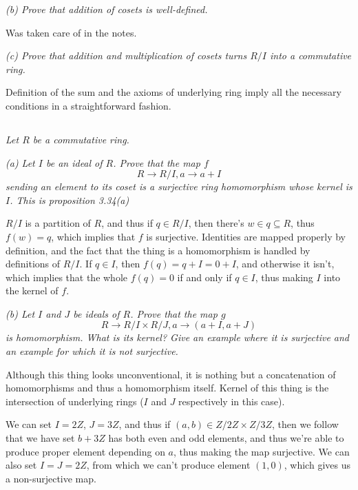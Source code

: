 \documentclass[11pt,oneside,titlepage]{book}
\begin{document}
\textit{(b) Prove that addition of cosets is well-defined.}

Was taken care of in the notes.

\textit{(c) Prove that addition and multiplication of cosets turns
  $R/I$ into a commutative ring.}

Definition of the sum and the axioms of underlying ring imply all the
necessary conditions in a straightforward fashion.

\subsection{}

\textit{Let $R$ be a commutative ring.}

\textit{(a) Let $I$ be an ideal of $R$. Prove that the map $f$
  $$R \to R/I, a \to a + I$$
  sending an element to its coset is a surjective ring homomorphism whose kernel is $I$.
  This is proposition 3.34(a)}

$R/I$ is a partition of $R$, and thus if $q \in R/I$, then there's $w
\in q \subseteq R$, thus $f(w) = q$, which implies that $f$ is
surjective. Identities are mapped properly by definition, and the fact
that the thing is a homomorphism is handled by definitions of $R/I$. If $q \in I$,
then $f(q) = q + I = 0 + I$, and otherwise it isn't, which implies that the whole
$f(q) = 0$ if and only if $q \in I$, thus making $I$ into the kernel of $f$.

\textit{(b) Let $I$ and $J$ be ideals of $R$. Prove that the map $g$
  $$R \to R/I \times R/J, a \to (a + I, a + J)$$
is homomorphism. What is its kernel? Give an example where it is
surjective and an example for which it is not surjective.}

Although this thing looks unconventional, it is nothing but a
concatenation of homomorphisms and thus a homomorphism itself. Kernel
of this thing is the intersection of underlying rings ($I$ and $J$
respectively in this case).

We can set $I = 2Z$, $J = 3Z$, and thus if $(a, b) \in Z/2Z \times Z/3Z$,
then we follow that we have set $b + 3Z$ has both even and odd elements,
and thus we're able to produce proper element depending on $a$, thus making the
map surjective. We can also set $I = J = 2Z$, from which we can't produce element
$(1, 0)$, which gives us a non-surjective map.

\subsection{}
\end{document}
